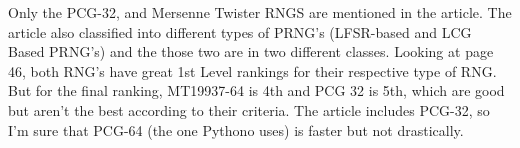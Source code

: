 \documentclass[
]{article}
\begin{document}
Only the PCG-32, and Mersenne Twister RNGS are mentioned in the article.
The article also classified into different types of PRNG's (LFSR-based
and LCG Based PRNG's) and the those two are in two different classes.
Looking at page 46, both RNG's have great 1st Level rankings for their
respective type of RNG. But for the final ranking, MT19937-64 is 4th and
PCG 32 is 5th, which are good but aren't the best according to their
criteria. The article includes PCG-32, so I'm sure that PCG-64 (the one
Pythono uses) is faster but not drastically.
\end{document}

